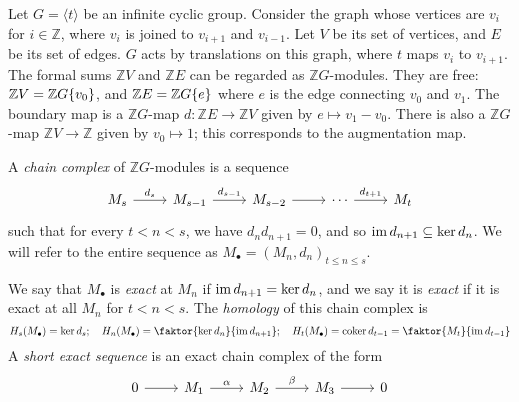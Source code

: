 \begin{example}
    Let \( G = \langle t \rangle \) be an infinite cyclic group.
    Consider the graph whose vertices are \( v_i \) for \( i \in \mathbb Z \), where \( v_i \) is joined to \( v_{i+1} \) and \( v_{i-1} \).
    Let \( V \) be its set of vertices, and \( E \) be its set of edges.
    \( G \) acts by translations on this graph, where \( t \) maps \( v_i \) to \( v_{i+1} \).
    The formal sums \( \mathbb Z V \) and \( \mathbb Z E \) can be regarded as \( \mathbb Z G \)-modules.
    They are free: \( \mathbb Z V = \mathbb Z G \qty{v_0} \), and \( \mathbb Z E = \mathbb Z G \qty{e} \) where \( e \) is the edge connecting \( v_0 \) and \( v_1 \).
    The boundary map is a \( \mathbb Z G \)-map \( d : \mathbb Z E \to \mathbb Z V \) given by \( e \mapsto v_1 - v_0 \).
    There is also a \( \mathbb Z G \)-map \( \mathbb Z V \to \mathbb Z \) given by \( v_0 \mapsto 1 \); this corresponds to the augmentation map.
\end{example}
\begin{definition}
    A \emph{chain complex} of \( \mathbb Z G \)-modules is a sequence
    \[\begin{tikzcd}
        {M_s} & {M_{s-1}} & {M_{s-2}} & \cdots & {M_t}
        \arrow["{d_s}", from=1-1, to=1-2]
        \arrow["{d_{s-1}}", from=1-2, to=1-3]
        \arrow[from=1-3, to=1-4]
        \arrow["{d_{t+1}}", from=1-4, to=1-5]
    \end{tikzcd}\]
    such that for every \( t < n < s \), we have \( d_n d_{n+1} = 0 \), and so \( \operatorname{im} d_{n+1} \subseteq \ker d_n \).
    We will refer to the entire sequence as \( M_\bullet = (M_n, d_n)_{t \leq n \leq s} \).
\end{definition}
We say that \( M_\bullet \) is \emph{exact} at \( M_n \) if \( \operatorname{im} d_{n+1} = \ker d_n \), and we say it is \emph{exact} if it is exact at all \( M_n \) for \( t < n < s \).
The \emph{homology} of this chain complex is
\[ H_s(M_\bullet) = \ker d_s;\quad H_n(M_\bullet) = \faktor{\ker d_n}{\im d_{n+1}};\quad H_t(M_\bullet) = \coker d_{t-1} = \faktor{M_t}{\im d_{t-1}} \]
A \emph{short exact sequence} is an exact chain complex of the form
\[\begin{tikzcd}
0 & {M_1} & {M_2} & {M_3} & 0
\arrow[from=1-1, to=1-2]
\arrow["\alpha", from=1-2, to=1-3]
\arrow["\beta", from=1-3, to=1-4]
\arrow[from=1-4, to=1-5]
\end{tikzcd}\]

